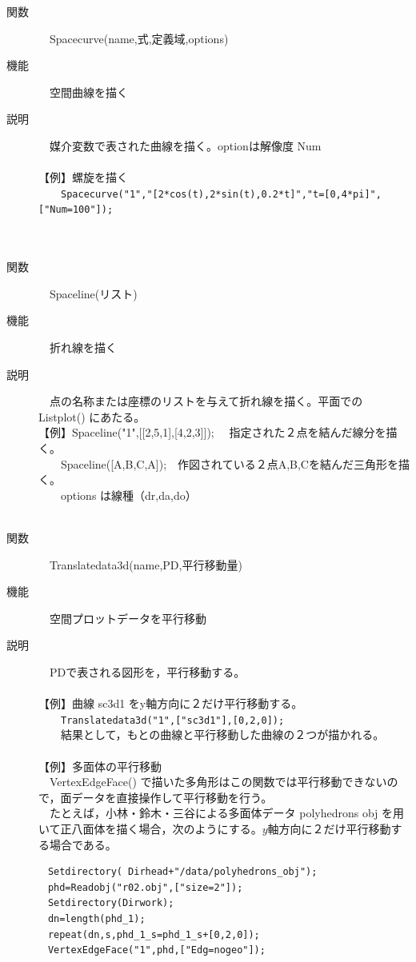 \documentclass[papersize,a4paper,12pt,uplatex]{jsarticle}
\begin{document}
\begin{description}
\hypertarget{spacecurve}{}
\item[関数]　Spacecurve(name,式,定義域,options)
\item[機能]　空間曲線を描く
\item[説明]　媒介変数で表された曲線を描く。optionは解像度 Num\\
　\\
【例】螺旋を描く\\
　　\verb|Spacecurve("1","[2*cos(t),2*sin(t),0.2*t]","t=[0,4*pi]",["Num=100"]);|\\
　\\
　　　　　\\

\hypertarget{spaceline}{}
\item[関数]　Spaceline(リスト)
\item[機能]　折れ線を描く
\item[説明]　点の名称または座標のリストを与えて折れ線を描く。平面での Listplot() にあたる。\\
【例】Spaceline("1",[[2,5,1],[4,2,3]]); 　指定された２点を結んだ線分を描く。\\
　　Spaceline([A,B,C,A]);　作図されている２点A,B,Cを結んだ三角形を描く。\\
　　options は線種（dr,da,do）\\
　\\

\hypertarget{translatedata3d}{}
\item[関数]　Translatedata3d(name,PD,平行移動量)
\item[機能]　空間プロットデータを平行移動
\item[説明]　PDで表される図形を，平行移動する。\\
　\\
【例】曲線 sc3d1 をy軸方向に２だけ平行移動する。\\
　　\verb|Translatedata3d("1",["sc3d1"],[0,2,0]);|\\
　　結果として，もとの曲線と平行移動した曲線の２つが描かれる。\\
　\\
【例】多面体の平行移動\\
　VertexEdgeFace() で描いた多角形はこの関数では平行移動できないので，面データを直接操作して平行移動を行う。\\
　たとえば，小林・鈴木・三谷による多面体データ  polyhedrons obj  を用いて正八面体を描く場合，次のようにする。$y$軸方向に２だけ平行移動する場合である。\\
\begin{verbatim}
　Setdirectory( Dirhead+"/data/polyhedrons_obj");
　phd=Readobj("r02.obj",["size=2"]);
　Setdirectory(Dirwork);
　dn=length(phd_1);
　repeat(dn,s,phd_1_s=phd_1_s+[0,2,0]);
　VertexEdgeFace("1",phd,["Edg=nogeo"]);
\end{verbatim}
　　　


\end{description}
\end{document}
